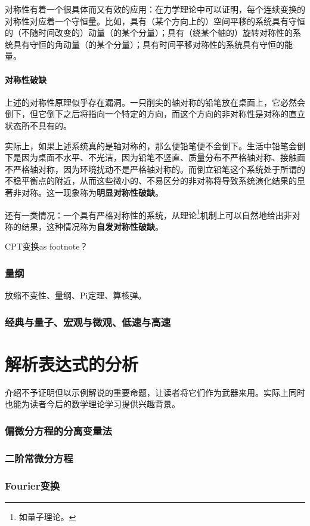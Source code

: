 \documentclass[10pt]{article}
\begin{document}
				对称性有着一个很具体而又有效的应用：在力学理论中可以证明，每个连续变换的对称性对应着一个守恒量。比如，具有（某个方向上的）空间平移的系统具有守恒的（不随时间改变的）动量（的某个分量）；具有（绕某个轴的）旋转对称性的系统具有守恒的角动量（的某个分量）；具有时间平移对称性的系统具有守恒的能量。

			\subsection{对称性破缺}
				上述的对称性原理似乎存在漏洞。一只削尖的轴对称的铅笔放在桌面上，它必然会倒下，但它倒下之后将指向一个特定的方向，而这个方向的非对称性是对称的直立状态所不具有的。

				实际上，如果上述系统真的是轴对称的，那么便铅笔便不会倒下。生活中铅笔会倒下是因为桌面不水平、不光洁，因为铅笔不竖直、质量分布不严格轴对称、接触面不严格轴对称，因为环境扰动不是严格轴对称的。而倒立铅笔这个系统处于所谓的不稳平衡点的附近，从而这些微小的、不易区分的非对称将导致系统演化结果的显著非对称。这一现象称为\textbf{明显对称性破缺}。

				还有一类情况：一个具有严格对称性的系统，从理论\footnote{如量子理论。}机制上可以自然地给出非对称的结果，这种情况称为\textbf{自发对称性破缺}。

				CPT变换as footnote？

		\section{量纲}
			放缩不变性、量纲、Pi定理、算核弹。


		\section{经典与量子、宏观与微观、低速与高速}

	\part{解析表达式的分析}
		介绍不予证明但以示例解说的重要命题，让读者将它们作为武器来用。实际上同时也能为读者今后的数学理论学习提供兴趣背景。
		
		\section{偏微分方程的分离变量法}
		\section{二阶常微分方程}
		\section{Fourier变换}
\end{document}
